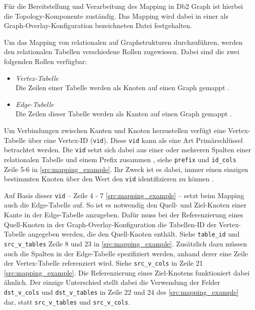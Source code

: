 Für die Bereitstellung und Verarbeitung des Mapping in Db2 Graph ist hierbei die Topology-Komponente zuständig. Das Mapping wird dabei in einer als Graph-Overlay-Konfiguration bezeichneten Datei festgehalten.  

Um das Mapping von relationalen auf Graphstrukturen durchzuführen, werden den relationalen Tabellen verschiedene Rollen zugewiesen. Dabei sind die zwei folgenden Rollen verfügbar:
\begin{itemize}
    \item \textit{Vertex-Tabelle}\\Die Zeilen einer Tabelle werden als Knoten auf einen Graph gemappt \cite{sigmod_tian, yt_tian}.
    \item \textit{Edge-Tabelle}\\Die Zeilen dieser Tabelle werden als Kanten auf einen Graph gemappt \cite{sigmod_tian, yt_tian}.
\end{itemize}


Um Verbindungen zwischen Kanten und Knoten herzustellen verfügt eine Vertex-Tabelle über eine Vertex-ID (\texttt{vid}). Diese \texttt{vid} kann als eine Art Primärschlüssel betrachtet werden. Die \texttt{vid} setzt sich dabei aus einer oder mehreren Spalten einer relationalen Tabelle und einem Prefix zusammen \cite{sigmod_tian, yt_tian}, siehe \texttt{prefix} und \texttt{id\_cols} Zeile 5-6 in \autoref{src:mapping_example}. Ihr Zweck ist es dabei, immer einen einzigen bestimmten Knoten über den Wert den \texttt{vid} identifizieren zu können \cite{sigmod_tian, yt_tian}. 

Auf Basis dieser \texttt{vid} -- Zeile 4 - 7 \autoref{src:mapping_example} -- setzt beim Mapping auch die Edge-Tabelle auf. So ist es notwendig den Quell- und Ziel-Knoten einer Kante in der Edge-Tabelle anzugeben. Dafür muss bei der Referenzierung eines Quell-Knoten in der Graph-Overlay-Konfiguration die Tabellen-ID der Vertex-Tabelle angegeben werden, die den Quell-Knoten enthält. Siehe \texttt{table\_id} und \texttt{src\_v\_tables} Zeile 8 und 23 in \autoref{src:mapping_example}. Zusätzlich dazu müssen auch die Spalten in der Edge-Tabelle spezifiziert werden, anhand derer eine Zeile der Vertex-Tabelle referenziert wird. Siehe \texttt{src\_v\_cols} in Zeile 21 \autoref{src:mapping_example}. Die Referenzierung eines Ziel-Knotens funktioniert dabei ähnlich. Der einzige Unterschied stellt dabei die Verwendung der Felder \texttt{dst\_v\_cols} und \texttt{dst\_v\_tables} in Zeile 22 und 24 des \autoref{src:mapping_example} dar, statt \texttt{src\_v\_tables} und \texttt{src\_v\_cols}.

